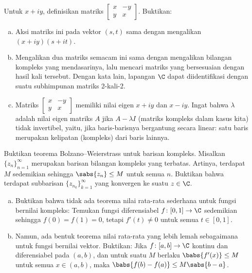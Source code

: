 \begin{samepage}
\begin{exercise}
Untuk $x +iy$, definisikan matriks
$\left[ \begin{smallmatrix} x & -y \\ y & x \end{smallmatrix} \right]$.
Buktikan:
\begin{enumerate}[a)]
\item
Aksi matriks ini pada vektor $(s,t)$ sama dengan mengalikan
$(x+iy)(s+it)$.
\item
Mengalikan dua matriks semacam ini sama dengan mengalikan bilangan kompleks
yang mendasarinya, lalu mencari matriks yang bersesuaian dengan hasil kali tersebut.
Dengan kata lain, lapangan $\C$ dapat diidentifikasi dengan suatu subhimpunan matriks 2-kali-2.
\item
Matriks
$\left[ \begin{smallmatrix} x & -y \\ y & x \end{smallmatrix} \right]$
memiliki nilai eigen $x+iy$ dan $x-iy$. Ingat bahwa $\lambda$ adalah
nilai eigen matriks $A$ jika $A-\lambda I$ (matriks kompleks dalam kasus kita)
tidak invertibel, yaitu,
jika baris-barisnya bergantung secara linear: satu baris merupakan kelipatan
(kompleks) dari baris lainnya.
\end{enumerate}
\end{exercise}
\end{samepage}

\begin{exercise}
Buktikan teorema Bolzano--Weierstrass untuk barisan kompleks.
Misalkan $\{ z_n \}_{n=1}^\infty$ merupakan barisan bilangan kompleks yang terbatas.
Artinya, terdapat $M$ sedemikian sehingga $\sabs{z_n} \leq M$ untuk semua $n$.
Buktikan bahwa terdapat subbarisan $\{ z_{n_k} \}_{k=1}^\infty$
yang konvergen ke suatu $z \in \C$.
\end{exercise}

\begin{exercise}
\leavevmode
\begin{enumerate}[a)]
\item
Buktikan bahwa tidak ada teorema nilai rata-rata sederhana untuk fungsi bernilai kompleks:
Temukan fungsi diferensiabel $f \colon [0,1] \to \C$ sedemikian sehingga
$f(0) = f(1) = 0$, tetapi $f'(t) \neq 0$ untuk semua $t \in [0,1]$.
\item
Namun, ada bentuk teorema nilai rata-rata yang lebih lemah sebagaimana untuk fungsi bernilai vektor.
Buktikan: Jika $f \colon [a,b] \to \C$ kontinu dan diferensiabel pada
$(a,b)$, dan untuk suatu $M$ berlaku $\babs{f'(x)} \leq M$ untuk semua $x \in (a,b)$, maka
$\babs{f(b)-f(a)} \leq M \sabs{b-a}$.
\end{enumerate}
\end{exercise}

